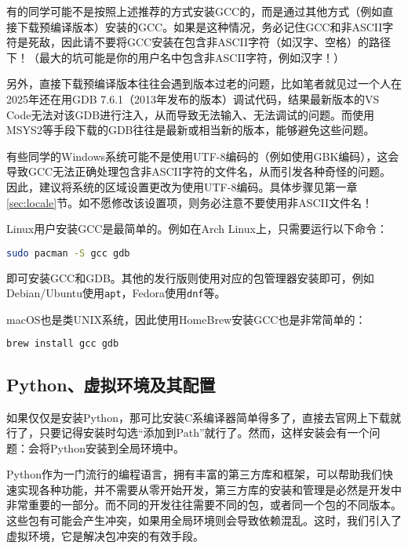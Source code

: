 \begin{caution}
  有的同学可能不是按照上述推荐的方式安装GCC的，而是通过其他方式（例如直接下载预编译版本）安装的GCC。如果是这种情况，务必记住GCC和非ASCII字符是死敌，因此请不要将GCC安装在包含非ASCII字符（如汉字、空格）的路径下！（最大的坑可能是你的用户名中包含非ASCII字符，例如汉字！）

  另外，直接下载预编译版本往往会遇到版本过老的问题，比如笔者就见过一个人在2025年还在用GDB 7.6.1（2013年发布的版本）调试代码，结果最新版本的VS Code无法对该GDB进行注入，从而导致无法输入、无法调试的问题。而使用MSYS2等手段下载的GDB往往是最新或相当新的版本，能够避免这些问题。
\end{caution}

\begin{caution}
  有些同学的Windows系统可能不是使用UTF-8编码的（例如使用GBK编码），这会导致GCC无法正确处理包含非ASCII字符的文件名，从而引发各种奇怪的问题。因此，建议将系统的区域设置更改为使用UTF-8编码。具体步骤见第一章\ref{sec:locale}节。如不愿修改该设置项，则务必注意不要使用非ASCII文件名！
\end{caution}

\begin{tip}
  Linux用户安装GCC是最简单的。例如在Arch Linux上，只需要运行以下命令：
\begin{lstlisting}[language=bash]
sudo pacman -S gcc gdb
\end{lstlisting}
  即可安装GCC和GDB。其他的发行版则使用对应的包管理器安装即可，例如Debian/Ubuntu使用\texttt{apt}，Fedora使用\texttt{dnf}等。

  macOS也是类UNIX系统，因此使用HomeBrew安装GCC也是非常简单的：
\begin{lstlisting}[language=bash]
brew install gcc gdb
\end{lstlisting}
\end{tip}

\subsection{Python、虚拟环境及其配置}\label{sec:virtualenv}

如果仅仅是安装Python，那可比安装C系编译器简单得多了，直接去官网上下载就行了，只要记得安装时勾选“添加到Path”就行了。然而，这样安装会有一个问题：会将Python安装到全局环境中。

Python作为一门流行的编程语言，拥有丰富的第三方库和框架，可以帮助我们快速实现各种功能，并不需要从零开始开发，第三方库的安装和管理是必然是开发中非常重要的一部分。而不同的开发往往需要不同的包，或者同一个包的不同版本。这些包有可能会产生冲突，如果用全局环境则会导致依赖混乱。这时，我们引入了虚拟环境，它是解决包冲突的有效手段。


